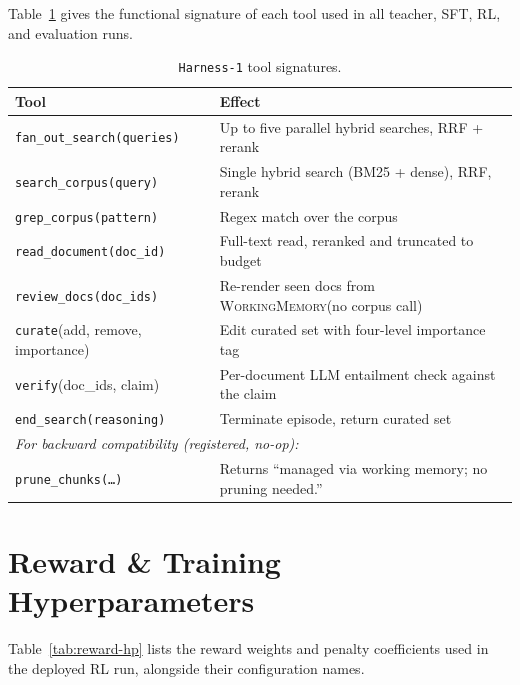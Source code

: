 \documentclass{article}
\newcommand{\sys}{\texttt{Harness-1}\xspace}
\newcommand{\wm}{\textsc{WorkingMemory}\xspace}
\newcommand{\verify}{\texttt{verify}\xspace}
\newcommand{\curate}{\texttt{curate}\xspace}
\begin{document}
Table~\ref{tab:tools} gives the functional signature of each tool used in all
teacher, SFT, RL, and evaluation runs.

\begin{table}[ht]
\centering
\small
\caption{\sys tool signatures.}
\label{tab:tools}
\begin{tabular}{ll}
\toprule
\textbf{Tool} & \textbf{Effect} \\
\midrule
\texttt{fan\_out\_search(queries)} & Up to five parallel hybrid searches, RRF + rerank \\
\texttt{search\_corpus(query)} & Single hybrid search (BM25 + dense), RRF, rerank \\
\texttt{grep\_corpus(pattern)} & Regex match over the corpus \\
\texttt{read\_document(doc\_id)} & Full-text read, reranked and truncated to budget \\
\texttt{review\_docs(doc\_ids)} & Re-render seen docs from \wm (no corpus call) \\
\curate(add, remove, importance) & Edit curated set with four-level importance tag \\
\verify(doc\_ids, claim) & Per-document LLM entailment check against the claim \\
\texttt{end\_search(reasoning)} & Terminate episode, return curated set \\
\midrule
\multicolumn{2}{l}{\emph{For backward compatibility (registered, no-op):}} \\
\texttt{prune\_chunks(\ldots)} & Returns ``managed via working memory; no pruning needed.'' \\
\bottomrule
\end{tabular}
\end{table}

\section{Reward \& Training Hyperparameters}
\label{app:reward}

Table~\ref{tab:reward-hp} lists the reward weights and penalty
coefficients used in the deployed RL run, alongside their
configuration names.
\end{document}
